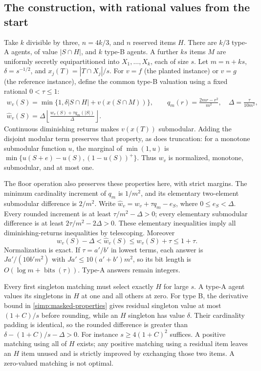 \subsection{The construction, with rational values from the start}

Take $k$ divisible by three, $n=4k/3$, and $n$ reserved items $H$.
There are $k/3$ type-A agents, of value $|S\cap H|$, and $k$
type-B agents.  A further $ks$ items $M$ are uniformly secretly
equipartitioned into $X_1,\ldots,X_k$, each of size $s$.
Let $m=n+ks$, $\delta=s^{-1/2}$, and
$x_j(T)=|T\cap X_j|/s$.
For $v=f$ (the planted instance) or $v=g$ (the reference instance),
define the common type-B valuation using a fixed rational $0<\tau\le1$:
\begin{equation}\label{simp:rational-B}
 \begin{gathered}
 w_v(S)=\min\{1,\delta|S\cap H|+v(x(S\cap M))\},\qquad
 q_m(r)=\frac{2mr-r^2}{m^2},\quad \Delta=\frac{\tau}{10m^2},\\
 \widehat w_v(S)=\Delta\left\lfloor
           \frac{w_v(S)+\tau q_m(|S|)}{\Delta}\right\rfloor.
 \end{gathered}
\end{equation}
Continuous diminishing returns makes $v(x(T))$ submodular.
Adding the disjoint modular term preserves that property, as does
truncation: for a monotone submodular function $u$, the marginal of
$\min(1,u)$ is $\min\{u(S+e)-u(S),(1-u(S))^+\}$.
Thus $w_v$ is normalized, monotone, submodular, and at most one.

The floor operation also preserves these properties here, with
strict margins.  The minimum cardinality increment of $q_m$ is
$1/m^2$, and its elementary two-element submodular difference is
$2/m^2$.  Write $\widehat w_v=w_v+\tau q_m-e_S$, where
$0\le e_S<\Delta$.  Every rounded increment is at least
$\tau/m^2-\Delta>0$; every elementary submodular difference is at
least $2\tau/m^2-2\Delta>0$.  These elementary inequalities imply
all diminishing-returns inequalities by telescoping.  Moreover
\begin{equation}\label{simp:rational-error}
 w_v(S)-\Delta<\widehat w_v(S)
             \le w_v(S)+\tau\le1+\tau.
\end{equation}
Normalization is exact.  If $\tau=a'/b'$ in lowest terms, each
answer is $Ja'/(10b'm^2)$ with $Ja'\le10(a'+b')m^2$,
so its bit length is $O(\log m+\operatorname{bits}(\tau))$.
Type-A answers remain integers.

Every first singleton matching must select exactly $H$ for large $s$.
A type-A agent values its singletons in $H$ at one and all others
at zero.  For type B, the derivative bound in
\eqref{simp:masked-properties} gives residual singleton value at
most $(1+C)/s$ before rounding, while an $H$ singleton has value
$\delta$.  Their cardinality padding is identical, so the rounded
difference is greater than $\delta-(1+C)/s-\Delta>0$.
For instance $s\ge4(1+C)^2$ suffices.  A positive matching using
all of $H$ exists; any positive matching using a residual item
leaves an $H$ item unused and is strictly improved by exchanging
those two items.  A zero-valued matching is not optimal.

